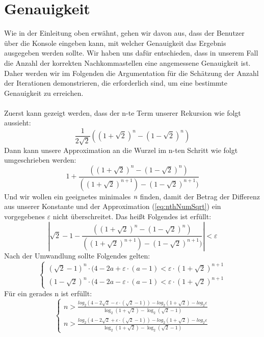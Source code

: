 \documentclass[course=erap]{aspdoc}
\begin{document}
\section{Genauigkeit}
Wie in der Einleitung oben erwähnt, gehen wir davon aus, dass der Benutzer über die Konsole eingeben kann, mit welcher Genauigkeit das Ergebnis ausgegeben werden sollte. Wir haben uns dafür entschieden, dass in unserem Fall die Anzahl der korrekten Nachkommastellen eine angemessene Genauigkeit ist. Daher werden wir im Folgenden die Argumentation für die Schätzung der Anzahl der Iterationen demonstrieren, die erforderlich sind, um eine bestimmte Genauigkeit zu erreichen.\\ 
\\Zuerst kann gezeigt werden, dass der n-te Term unserer Rekursion wie folgt aussieht:
\begin{equation}\label{eq:nthNum}
\frac{1}{2\sqrt{2}}((1+\sqrt{2})^n-(1-\sqrt{2})^n)
\end{equation}
Dann kann unsere Approximation an die Wurzel im n-ten Schritt wie folgt umgeschrieben werden:
\begin{equation}\label{eq:nthNumSqrt}
1+\frac{((1+\sqrt{2})^n-(1-\sqrt{2})^n)}{((1+\sqrt{2})^{n+1})-(1-\sqrt{2})^{n+1})}
\end{equation}
Und wir wollen ein geeignetes minimales $\emph{n}$ finden, damit der Betrag der Differenz aus unserer Konstante und der Approximation (\ref{eq:nthNumSqrt}) ein vorgegebenes $\varepsilon$ nicht überschreitet. Das heißt Folgendes ist erfüllt:
\begin{equation}\label{eq:errAprx}
|\sqrt{2}-1-\frac{((1+\sqrt{2})^n-(1-\sqrt{2})^n)}{((1+\sqrt{2})^{n+1})-(1-\sqrt{2})^{n+1})}|<\varepsilon
\end{equation}
Nach der Umwandlung sollte Folgendes gelten:
\begin{equation*}\label{eq:error2} 
\begin{cases} 
(\sqrt{2}-1)^n\cdot(4-2a+\varepsilon\cdot(a-1)<\varepsilon\cdot(1+\sqrt{2})^{n+1}
\\ (1-\sqrt{2})^n\cdot(4-2a-\varepsilon\cdot(a-1)<\varepsilon\cdot(1+\sqrt{2})^{n+1}
\end{cases}
\end{equation*}
Für ein gerades n ist erfüllt:
\begin{equation}\label{eq:errorLog} 
\begin{cases} 
n>\frac{log_2{(4-2\sqrt{2}-\varepsilon\cdot(\sqrt{2}-1))}-log_2{(1+\sqrt{2})}-log_2{\varepsilon}}{\log_2{(1+\sqrt{2})-\log_2{(\sqrt{2}-1)}}}
\\ n>\frac{log_2{(4-2\sqrt{2}+\varepsilon\cdot(\sqrt{2}-1))}-log_2{(1+\sqrt{2})}-log_2{\varepsilon}}{\log_2{(1+\sqrt{2})-\log_2{(\sqrt{2}-1)}}}
\end{cases}
\end{equation}
\end{document}
